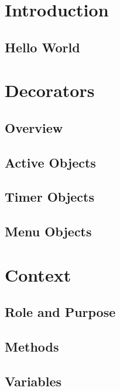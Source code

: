 





\chapter{Introduction}
	\section{Hello World}
	

\chapter{Decorators}
	\section{Overview}
	
	
	\section{Active Objects}
	
	
	\section{Timer Objects}
	
	
	\section{Menu Objects}
	
\chapter{Context}
	\section{Role and Purpose}
	
	
	\section{Methods}
	
	
	\section{Variables}
	
	
